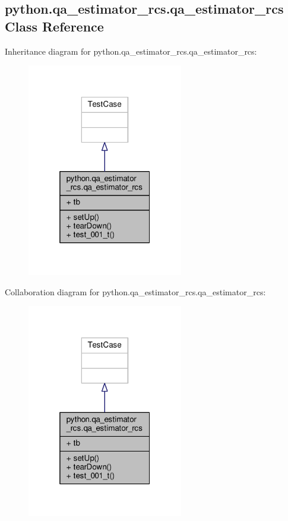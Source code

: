 \subsection{python.\+qa\+\_\+estimator\+\_\+rcs.\+qa\+\_\+estimator\+\_\+rcs Class Reference}
\label{classpython_1_1qa__estimator__rcs_1_1qa__estimator__rcs}


Inheritance diagram for python.\+qa\+\_\+estimator\+\_\+rcs.\+qa\+\_\+estimator\+\_\+rcs\+:
\nopagebreak
\begin{figure}[H]
\begin{center}
\leavevmode
\includegraphics[width=193pt]{df/d77/classpython_1_1qa__estimator__rcs_1_1qa__estimator__rcs__inherit__graph}
\end{center}
\end{figure}


Collaboration diagram for python.\+qa\+\_\+estimator\+\_\+rcs.\+qa\+\_\+estimator\+\_\+rcs\+:
\nopagebreak
\begin{figure}[H]
\begin{center}
\leavevmode
\includegraphics[width=193pt]{d9/d68/classpython_1_1qa__estimator__rcs_1_1qa__estimator__rcs__coll__graph}
\end{center}
\end{figure}
